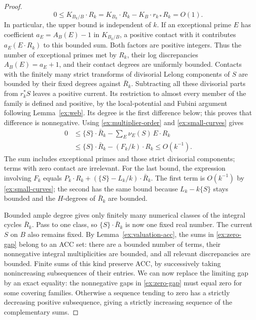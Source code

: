 \begin{proof}
\begin{equation}
 0\leq K_{B_k/B}\cdot R_k
   =K_{B_k}\cdot R_k-K_B\cdot r_{k*}R_k=O(1).
\end{equation}
In particular, the upper bound is independent of \(k\).
If an exceptional prime \(E\) has coefficient
\(a_E=A_B(E)-1\) in \(K_{B_k/B}\), a positive contact with
it contributes \(a_E(E\cdot R_k)\) to this bounded sum.
Both factors are positive integers. Thus the number of
exceptional primes met by \(R_k\), their log discrepancies
\(A_B(E)=a_E+1\), and their contact degrees are uniformly
bounded. Contacts with the finitely many strict transforms
of divisorial Lelong components of \(S\) are bounded by their
fixed degrees against \(\bar R_k\). Subtracting all these
divisorial parts from \(r_k^*S\) leaves a positive current.
Its restriction to almost every member of the family is
defined and positive, by the local-potential and Fubini
argument following Lemma~\ref{ex:web}. Its degree is the
first difference below; this proves that difference is
nonnegative. Using \eqref{ex:multiplier-order} and
\eqref{ex:small-curves} gives
\begin{equation}\label{ex:zero-gap}
 \begin{split}
 0&\leq \{S\}\cdot\bar R_k
          -\sum_E\nu_E(S)\,E\cdot R_k\\
  &\leq \{S\}\cdot\bar R_k-(F_k/k)\cdot R_k
   \leq O(k^{-1}).
 \end{split}
\end{equation}
The sum includes exceptional primes and those strict
divisorial components; terms with zero contact are irrelevant.
For the last bound, the expression involving \(F_k\) equals
\(P_k\cdot R_k+(\{S\}-L_k/k)\cdot\bar R_k\).
The first term is \(O(k^{-1})\) by \eqref{ex:small-curves};
the second has the same bound because \(L_k-k\{S\}\) stays
bounded and the \(H\)-degrees of \(\bar R_k\) are bounded.

Bounded ample degree gives only finitely many numerical
classes of the integral cycles \(\bar R_k\). Pass to one
class, so \(\{S\}\cdot\bar R_k\) is now one fixed real
number. The current \(S\) on \(B\) also remains fixed. By
Lemma~\ref{ex:valuation-acc}, the sums in
\eqref{ex:zero-gap} belong to an ACC set: there are a bounded
number of terms, their nonnegative integral multiplicities
are bounded, and all relevant discrepancies are bounded.
Finite sums of this kind preserve ACC, by successively
taking nonincreasing subsequences of their entries.
We can now replace the limiting gap by an exact equality: the
nonnegative gaps in \eqref{ex:zero-gap} must equal zero for some
covering families. Otherwise a sequence
tending to zero has a strictly decreasing positive
subsequence, giving a strictly increasing sequence of the
complementary sums.


\end{proof}
